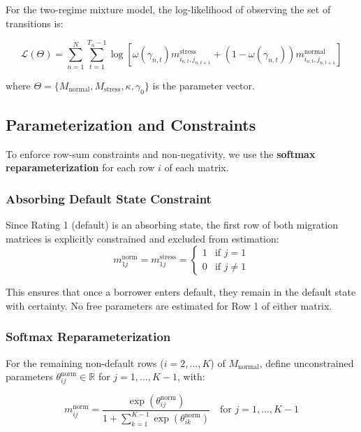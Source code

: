 \documentclass[12pt,a4paper]{article}
\newcommand{\Mnormal}{M_{\text{normal}}}
\newcommand{\Mstress}{M_{\text{stress}}}
\begin{document}
For the two-regime mixture model, the log-likelihood of observing the set of transitions is:

\begin{equation}
\label{eq:loglik}
\mathcal{L}(\Theta) = \sum_{n=1}^{N} \sum_{t=1}^{T_n-1} \log \left[ \omega(\gamma_{n,t}) m_{i_{n,t},j_{n,t+1}}^{\text{stress}} + (1 - \omega(\gamma_{n,t})) m_{i_{n,t},j_{n,t+1}}^{\text{normal}} \right]
\end{equation}

where $\Theta = \{ \Mnormal, \Mstress, \kappa, \gamma_0 \}$ is the parameter vector.

\subsection{Parameterization and Constraints}

To enforce row-sum constraints and non-negativity, we use the \textbf{softmax reparameterization} for each row $i$ of each matrix.

\subsubsection{Absorbing Default State Constraint}

Since Rating 1 (default) is an absorbing state, the first row of both migration matrices is explicitly constrained and excluded from estimation:
\begin{equation}
m_{1j}^{\text{norm}} = m_{1j}^{\text{stress}} = \begin{cases} 1 & \text{if } j = 1 \\ 0 & \text{if } j \neq 1 \end{cases}
\end{equation}

This ensures that once a borrower enters default, they remain in the default state with certainty. No free parameters are estimated for Row 1 of either matrix.

\subsubsection{Softmax Reparameterization}

For the remaining non-default rows ($i = 2, \ldots, K$) of $\Mnormal$, define unconstrained parameters $\theta_{ij}^{\text{norm}} \in \mathbb{R}$ for $j = 1,\ldots,K-1$, with:

\begin{equation}
m_{ij}^{\text{norm}} = \frac{\exp(\theta_{ij}^{\text{norm}})}{1 + \sum_{k=1}^{K-1} \exp(\theta_{ik}^{\text{norm}})} \quad \text{for } j=1,\ldots,K-1
\end{equation}
\end{document}

